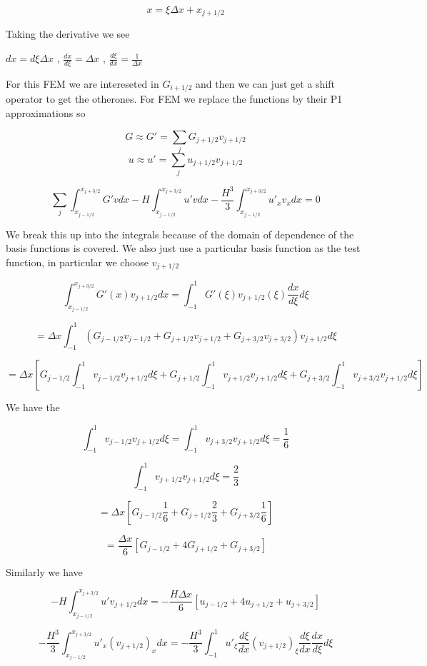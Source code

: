 \documentclass[12pt]{article}
\begin{document}
$$x = \xi\Delta x + x_{j+1/2}$$

Taking the derivative we see

$dx = d\xi\Delta x$ , $\frac{dx}{d\xi} = \Delta x$ , $\frac{d\xi}{dx} = \frac{1}{\Delta x}$ 


For this FEM we are intereseted in $G_{i+1/2}$ and then we can just get a shift operator to get the otherones. For FEM we replace the functions by their P1 approximations so

\[G \approx G' = \sum_{j}G_{j+ 1/2}v_{j+ 1/2}\]
\[u \approx u' = \sum_{j}u_{j+ 1/2}v_{j+ 1/2}\]

\[\sum_{j}\int_{x_{j-1/2}}^{x_{j+3/2}} G'v dx - H\int_{x_{j-1/2}}^{x_{j+3/2}} u'v dx -  \frac{H^3}{3}\int_{x_{j-1/2}}^{x_{j+3/2}}u'_{x}v_{x}dx = 0 \]

We break this up into the integrals because of the domain of dependence of the basis functions is covered. We also just use a particular basis function as the test function, in particular we choose $v_{j + 1/2}$

\[\int_{x_{j-1/2}}^{x_{j+3/2}} G'(x)v_{j + 1/2} dx = \int_{-1}^{1} G'(\xi)v_{j + 1/2}(\xi) \frac{d x}{d\xi}d\xi\]

\[= \Delta x \int_{-1}^{1} \left(G_{j- 1/2}v_{j - 1/2} + G_{j+ 1/2}v_{j+ 1/2} +G_{j+ 3/2}v_{j+ 3/2} \right)v_{j + 1/2} d\xi\]

\[= \Delta x \left[G_{j- 1/2} \int_{-1}^{1} v_{j - 1/2}v_{j + 1/2} d\xi + G_{j+ 1/2} \int_{-1}^{1} v_{j + 1/2}v_{j + 1/2} d\xi +  G_{j+3/2} \int_{-1}^{1} v_{j + 3/2}v_{j + 1/2} d\xi\right]\]

We have the 

\[\int_{-1}^{1} v_{j - 1/2}v_{j + 1/2} d\xi =  \int_{-1}^{1} v_{j + 3/2}v_{j + 1/2} d\xi = \frac{1}{6}\]

\[\int_{-1}^{1} v_{j + 1/2}v_{j + 1/2} d\xi = \frac{2}{3}\]

\[= \Delta x \left[G_{j- 1/2} \frac{1}{6} + G_{j+ 1/2} \frac{2}{3} +  G_{j+3/2} \frac{1}{6}\right]\]

\[=  \frac{\Delta x}{6} \left[G_{j- 1/2} + 4G_{j+ 1/2} +  G_{j+3/2} \right]\]

Similarly we have

\[- H\int_{x_{j-1/2}}^{x_{j+3/2}} u'v_{j+ 1/2} dx = -\frac{H\Delta x}{6} \left[u_{j- 1/2} + 4u_{j+ 1/2} +  u_{j+3/2} \right] \]



\[-\frac{H^3}{3}\int_{x_{j-1/2}}^{x_{j+3/2}}u'_{x}(v_{j+ 1/2})_{x}dx = -\frac{H^3}{3}\int_{-1}^{1}u'_{\xi}\frac{d \xi }{dx}(v_{j+ 1/2})_{\xi}\frac{d \xi }{dx} \frac{d x}{d\xi} d\xi   \]
\end{document}
